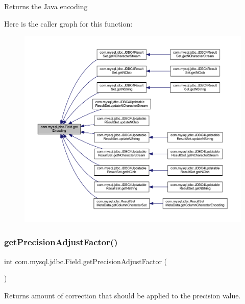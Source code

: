 \begin{DoxyReturn}{Returns}
the Java encoding 
\end{DoxyReturn}
Here is the caller graph for this function\+:
\nopagebreak
\begin{figure}[H]
\begin{center}
\leavevmode
\includegraphics[width=350pt]{classcom_1_1mysql_1_1jdbc_1_1_field_a7deff67d821ec5ec20a675db24b28c47_icgraph}
\end{center}
\end{figure}
\mbox{\label{classcom_1_1mysql_1_1jdbc_1_1_field_a9b3064e50f673507d96842fd16496a0d}} 
\subsubsection{\texorpdfstring{get\+Precision\+Adjust\+Factor()}{getPrecisionAdjustFactor()}}
{\footnotesize\ttfamily int com.\+mysql.\+jdbc.\+Field.\+get\+Precision\+Adjust\+Factor (\begin{DoxyParamCaption}{ }\end{DoxyParamCaption})}

Returns amount of correction that should be applied to the precision value.

